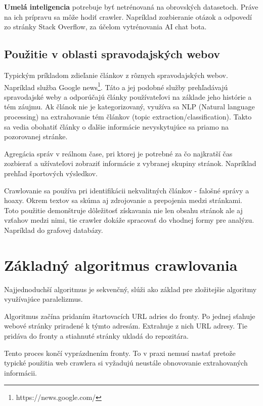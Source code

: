 \textbf{Umelá inteligencia} potrebuje byť netrénovaná na obrovských datasetoch. Práve na ich prípravu sa môže hodiť crawler. Napríklad zozbieranie otázok a odpovedí zo stránky Stack Overflow, za účelom vytrénovania AI chat bota. \cite{stackOverflowCrawl}

\subsection{Použitie v oblasti spravodajských webov}
Typickým príkladom zdieľanie článkov z rôznych spravodajských webov. Napríklad služba Google news\footnote{https://news.google.com/}. Táto a jej podobné služby prehľadávajú spravodajské weby a odporúčajú články používateľovi na základe jeho histórie a tém záujmu. Ak článok nie je kategorizovaný, využíva sa NLP (Natural language processing) na extrahovanie tém článkov (topic extraction/classification). Takto sa vedia obohatiť články o ďalšie informácie nevyskytujúce sa priamo na pozorovanej stránke.

Agregácia správ v reálnom čase, pri ktorej je potrebné za čo najkratší čas zozbierať a užívateľovi zobraziť informácie z vybranej skupiny stránok. Napríklad prehľad športových výsledkov. 

Crawlovanie sa používa pri identifikácii nekvalitných článkov - falošné správy a hoaxy.\cite{fakeNews} Okrem textov sa skúma aj zdrojovanie a prepojenia medzi stránkami. Toto použitie demonštruje dôležitosť získavania nie len obsahu stránok ale aj vzťahov medzi nimi, tie crawler dokáže spracovať do vhodnej formy pre analýzu. Napríklad do grafovej databázy. 



\section{Základný algoritmus crawlovania}
Najjednoduchší algoritmus je sekvenčný, slúži ako základ pre zložitejšie algoritmy využívajúce paralelizmus. 

Algoritmus začína pridaním štartovacích URL adries do fronty. Po jednej sťahuje webové stránky priradené k týmto adresám. Extrahuje z nich URL adresy. Tie pridáva do fronty a stiahnuté stránky ukladá do repozitára.

Tento proces končí vyprázdnením fronty. To v praxi nemusí nastať pretože typické použitia web crawlera si vyžadujú neustále obnovovanie extrahovaných informácii.


